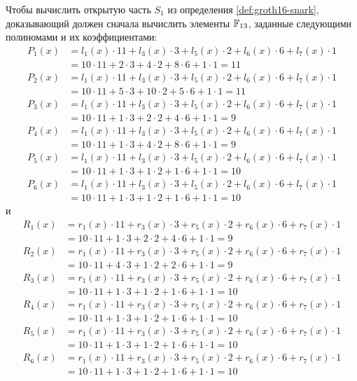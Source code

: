 Чтобы вычислить открытую часть $S_1$ из определения \ref{def:groth16-snark}, доказывающий должен сначала вычислить элементы $\mathbb{F}_{13}$, заданные следующими полиномами и их коэффициентами:
\begin{align*}
P_1(x) & = l_1(x)\cdot 11 + l_3(x)\cdot 3 + l_5(x)\cdot 2 + l_6(x)\cdot 6 + l_7(x)\cdot 1 \\
       & = 10\cdot 11 + 2\cdot 3 + 4\cdot 2 + 8\cdot 6 + 1\cdot 1 = 11\\
P_2(x) & = l_1(x)\cdot 11 + l_3(x)\cdot 3 + l_5(x)\cdot 2 + l_6(x)\cdot 6 + l_7(x)\cdot 1 \\
       & = 10\cdot 11 + 5\cdot 3 + 10\cdot 2 + 5\cdot 6 + 1\cdot 1 = 11\\
P_3(x) & = l_1(x)\cdot 11 + l_3(x)\cdot 3 + l_5(x)\cdot 2 + l_6(x)\cdot 6 + l_7(x)\cdot 1 \\
       & = 10\cdot 11 + 1\cdot 3 + 2\cdot 2 + 4\cdot 6 + 1\cdot 1 = 9\\
P_4(x) & = l_1(x)\cdot 11 + l_3(x)\cdot 3 + l_5(x)\cdot 2 + l_6(x)\cdot 6 + l_7(x)\cdot 1 \\
       & = 10\cdot 11 + 1\cdot 3 + 4\cdot 2 + 8\cdot 6 + 1\cdot 1 = 9\\
P_5(x) & = l_1(x)\cdot 11 + l_3(x)\cdot 3 + l_5(x)\cdot 2 + l_6(x)\cdot 6 + l_7(x)\cdot 1 \\
       & = 10\cdot 11 + 1\cdot 3 + 1\cdot 2 + 1\cdot 6 + 1\cdot 1 = 10\\
P_6(x) & = l_1(x)\cdot 11 + l_3(x)\cdot 3 + l_5(x)\cdot 2 + l_6(x)\cdot 6 + l_7(x)\cdot 1 \\
       & = 10\cdot 11 + 1\cdot 3 + 1\cdot 2 + 1\cdot 6 + 1\cdot 1 = 10
\end{align*}
и
\begin{align*}
R_1(x) & = r_1(x)\cdot 11 + r_3(x)\cdot 3 + r_5(x)\cdot 2 + r_6(x)\cdot 6 + r_7(x)\cdot 1 \\
       & = 10\cdot 11 + 1\cdot 3 + 2\cdot 2 + 4\cdot 6 + 1\cdot 1 = 9\\
R_2(x) & = r_1(x)\cdot 11 + r_3(x)\cdot 3 + r_5(x)\cdot 2 + r_6(x)\cdot 6 + r_7(x)\cdot 1 \\
       & = 10\cdot 11 + 4\cdot 3 + 1\cdot 2 + 2\cdot 6 + 1\cdot 1 = 9\\
R_3(x) & = r_1(x)\cdot 11 + r_3(x)\cdot 3 + r_5(x)\cdot 2 + r_6(x)\cdot 6 + r_7(x)\cdot 1 \\
       & = 10\cdot 11 + 1\cdot 3 + 1\cdot 2 + 1\cdot 6 + 1\cdot 1 = 10\\
R_4(x) & = r_1(x)\cdot 11 + r_3(x)\cdot 3 + r_5(x)\cdot 2 + r_6(x)\cdot 6 + r_7(x)\cdot 1 \\
       & = 10\cdot 11 + 1\cdot 3 + 1\cdot 2 + 1\cdot 6 + 1\cdot 1 = 10\\
R_5(x) & = r_1(x)\cdot 11 + r_3(x)\cdot 3 + r_5(x)\cdot 2 + r_6(x)\cdot 6 + r_7(x)\cdot 1 \\
       & = 10\cdot 11 + 1\cdot 3 + 1\cdot 2 + 1\cdot 6 + 1\cdot 1 = 10\\
R_6(x) & = r_1(x)\cdot 11 + r_3(x)\cdot 3 + r_5(x)\cdot 2 + r_6(x)\cdot 6 + r_7(x)\cdot 1 \\
       & = 10\cdot 11 + 1\cdot 3 + 1\cdot 2 + 1\cdot 6 + 1\cdot 1 = 10
\end{align*}
